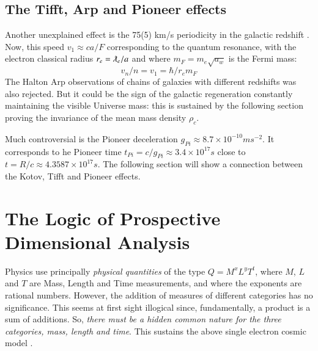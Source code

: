\documentclass[twoside,draft]{article}
\begin{document}
\begin{sloppypar}
\subsection{The Tifft, Arp and Pioneer effects}

Another unexplained effect is the 75(5) km/s periodicity in the galactic redshift \cite{Tifft}. Now, this speed $v_1 \approx ca/F$ corresponding to the quantum resonance, with the electron classical radius $r_{e} = \lambdabar_e/a$  and where $m_{F} = m_{e}\sqrt{a_{w}}$ is the Fermi mass:
\begin{equation}
v_{n}/n = v_{1} = \hbar /r_{e} m_{F}
\end{equation}
The Halton Arp observations of chains of galaxies with different redshifts \cite{Arp} was also rejected. But it could be the sign of the galactic regeneration constantly maintaining the visible Universe mass: this is sustained by the following section proving the invariance of the mean mass density $\rho_{c}$.

Much controversial is the Pioneer deceleration \cite{Nieto} $g_{Pi} \approx 8.7 \times 10^{-10} ms^{-2}$. It corresponds to he Pioneer time $t_{Pi} = c/g_{Pi} \approx 3.4 \times 10^{17} s $ close to $t = R/c \approx 4.3587 \times 10^{17} s $. The following section will show a connection between the Kotov, Tifft and Pioneer effects.

\section{The Logic of Prospective Dimensional Analysis}

Physics use principally \textit{physical quantities} of the type $Q = M^{x} L^{y} T^{t}$, where $M$, $L$ and $T$ are Mass, Length and Time measurements, and where the exponents are rational numbers. However, the addition of measures of different categories has no significance. This seems at first sight illogical since, fundamentally, a product is a sum of additions. So, \textit{there must be a hidden common nature for the three categories, mass, length and time}. This sustains the above single electron cosmic model \cite{Sanchez1}. 


\end{sloppypar}
\end{document}
